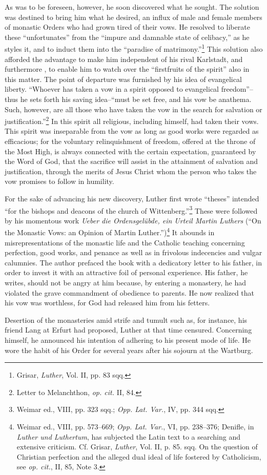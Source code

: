 As was to be foreseen, however, he soon discovered what he sought.
The solution was destined to bring him what he desired, an influx of
male and female members of monastic Orders who had grown tired of
their vows. He resolved to liberate these “unfortunates” from the
“impure and damnable state of celibacy,” as he styles it, and to induct
them into the “paradise of matrimony.”\footnote{Grisar, \textit{Luther}, Vol. II, pp. 83 sqq.}
This solution also afforded
the advantage to make him independent of his rival Karlstadt, and furthermore
, to enable him to watch over the “firstfruits of the spirit”
also in this matter. The point of departure was furnished by his idea
of evangelical liberty. “Whoever has taken a vow in a spirit opposed
to evangelical freedom”--thus he sets forth his saving idea--“must
be set free, and his vow be anathema. Such, however, are all those
who have taken the vow in the search for salvation or justification.”\footnote{Letter to Melanchthon, \textit{op. cit.} II, 84.}
In this spirit all religious, including himself, had taken their
vows. This spirit was inseparable from the vow as long as good works
were regarded as efficacious; for the voluntary relinquishment of
freedom, offered at the throne of the Most High, is always connected
with the certain expectation, guaranteed by the Word of God, that
the sacrifice will assist in the attainment of salvation and justification,
through the merits of Jesus Christ whom the person who takes the
vow promises to follow in humility.

For the sake of advancing his new discovery, Luther first wrote
“theses” intended “for the bishops and deacons of the church of
Wittenberg.”\footnote{Weimar ed., VIII, pp. 323 sqq.; \textit{Opp. Lat. Var.}, IV, pp. 344 sqq.}
These were followed by his momentous work \textit{Ueber die
Ordensgelübde, ein Urteil Martin Luthers} (“On the Monastic
Vows: an Opinion of Martin Luther.”)\footnote
{Weimar ed., VIII, pp. 573--669; \textit{Opp. Lat. Var.}, VI, pp. 238--376; Denifle, in \textit{Luther
und Luthertum}, has subjected the Latin text to a searching and extensive criticism. Cf.
Grisar, \textit{Luther}, Vol. II, p. 85. sqq. On the question of Christian perfection and the alleged
dual ideal of life fostered by Catholicism, see \textit{op. cit.}, II, 85, Note 3.}
It abounds in misrepresentations
of the monastic life and the Catholic teaching concerning
perfection, good works, and penance as well as in frivolous indecencies
and vulgar calumnies. The author prefaced the book with a dedicatory
letter to his father, in order to invest it with an attractive foil of
personal experience. His father, he writes, should not be angry at him
because, by entering a monastery, he had violated the grave commandment
of obedience to parents. He now realized that his vow was
worthless, for God had released him from his fetters.

Desertion of the monasteries amid strife and tumult such as, for
instance, his friend Lang at Erfurt had proposed, Luther at that time
censured. Concerning himself, he announced his intention of adhering to
his present mode of life. He wore the habit of his Order for
several years after his sojourn at the Wartburg.
